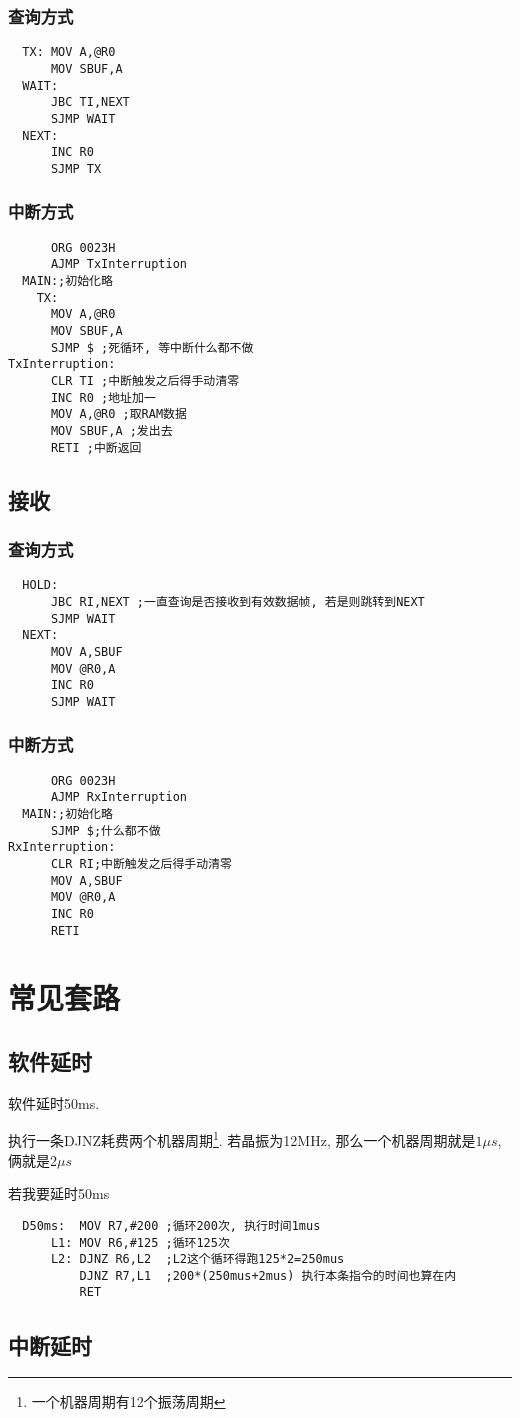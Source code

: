 \documentclass[a4paper]{report}
\begin{document}
\subsection{查询方式}
\begin{verbatim}
  TX: MOV A,@R0
      MOV SBUF,A
  WAIT:
      JBC TI,NEXT
      SJMP WAIT
  NEXT:
      INC R0
      SJMP TX
\end{verbatim}
\subsection{中断方式}
\begin{verbatim}
      ORG 0023H
      AJMP TxInterruption
  MAIN:;初始化略
    TX:
      MOV A,@R0
      MOV SBUF,A
      SJMP $ ;死循环, 等中断什么都不做
TxInterruption:
      CLR TI ;中断触发之后得手动清零
      INC R0 ;地址加一
      MOV A,@R0 ;取RAM数据
      MOV SBUF,A ;发出去
      RETI ;中断返回
\end{verbatim}
\section{接收}
\subsection{查询方式}
\begin{verbatim}
  HOLD:
      JBC RI,NEXT ;一直查询是否接收到有效数据帧, 若是则跳转到NEXT
      SJMP WAIT
  NEXT:
      MOV A,SBUF
      MOV @R0,A
      INC R0
      SJMP WAIT

\end{verbatim}
\subsection{中断方式}
\begin{verbatim}
      ORG 0023H
      AJMP RxInterruption
  MAIN:;初始化略
      SJMP $;什么都不做
RxInterruption:
      CLR RI;中断触发之后得手动清零
      MOV A,SBUF
      MOV @R0,A
      INC R0
      RETI
\end{verbatim}
\chapter{常见套路}
\section{软件延时}
软件延时50ms. 

执行一条DJNZ耗费两个机器周期\footnote{一个机器周期有12个振荡周期}. 若晶振为12MHz, 那么一个机器周期就是$1\mu s$, 俩就是2$\mu s$

若我要延时50ms
\begin{verbatim}
  D50ms:  MOV R7,#200 ;循环200次, 执行时间1mus
      L1: MOV R6,#125 ;循环125次
      L2: DJNZ R6,L2  ;L2这个循环得跑125*2=250mus
          DJNZ R7,L1  ;200*(250mus+2mus) 执行本条指令的时间也算在内
          RET
\end{verbatim}
\section{中断延时}
\end{document}

